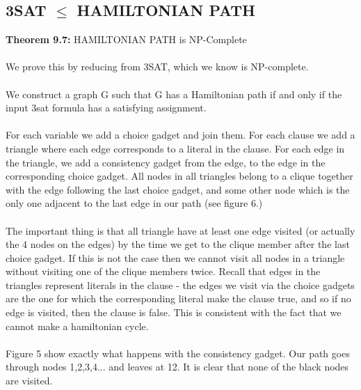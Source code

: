 \documentclass{article}
\begin{document}
\subsection{3SAT $\le$ HAMILTONIAN PATH}
\textbf{Theorem 9.7:} HAMILTONIAN PATH is NP-Complete\\\\
We prove this by reducing from 3SAT, which we know is NP-complete.\\\\
We construct a graph G such that G has a Hamiltonian path if and only if the input 3sat formula has a satisfying assignment.\\\\
For each variable we add a choice gadget and join them. For each clause we add a triangle where each edge corresponds to a literal in the clause. For each edge in the triangle, we add a consistency gadget from the edge, to the edge in the corresponding choice gadget. All nodes in all triangles belong to a clique together with the edge following the last choice gadget, and some other node which is the only one adjacent to the last edge in our path (see figure 6.)\\\\
The important thing is that all triangle have at least one edge visited (or actually the 4 nodes on the edges) by the time we get to the clique member after the last choice gadget. If this is not the case then we cannot visit all nodes in a triangle without visiting one of the clique members twice. Recall that edges in the triangles represent literals in the clause - the edges we visit via the choice gadgets are the one for which the corresponding literal make the clause true, and so if no edge is visited, then the clause is false. This is consistent with the fact that we cannot make a hamiltonian cycle. \\\\
Figure 5 show exactly what happens with the consistency gadget. Our path goes through nodes 1,2,3,4... and leaves at 12. It is clear that none of the black nodes are visited. \\\\
\end{document}

